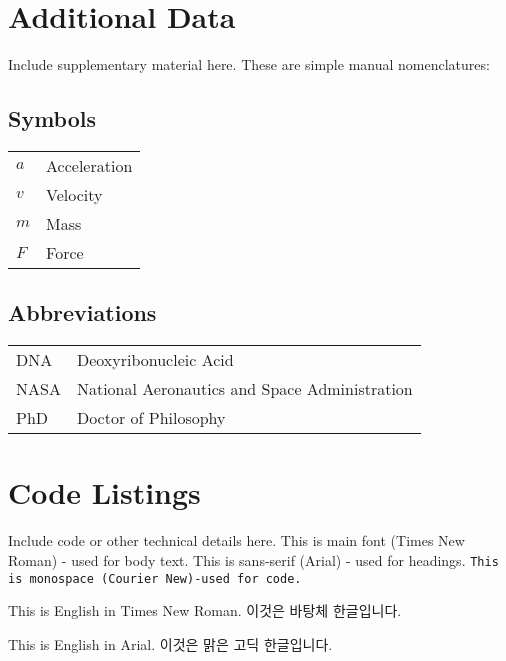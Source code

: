 \appendix	

\chapter{Additional Data}

Include supplementary material here. These are simple manual nomenclatures:

\section*{Symbols}
\begin{tabular}{ll}
$a$ & Acceleration \\
$v$ & Velocity \\
$m$ & Mass \\
$F$ & Force \\
\end{tabular}

\section*{Abbreviations}
\begin{tabular}{ll}
DNA & Deoxyribonucleic Acid \\
NASA & National Aeronautics and Space Administration \\
PhD & Doctor of Philosophy \\
\end{tabular}

\chapter{Code Listings}

Include code or other technical details here. This is main font (Times New Roman) - used for body text.
\textsf{This is sans-serif (Arial) - used for headings.}	
\texttt{This is monospace (Courier New)-used for code.}

This is English in Times New Roman. 이것은 바탕체 한글입니다.

\textsf{This is English in Arial. 이것은 맑은 고딕 한글입니다.}

